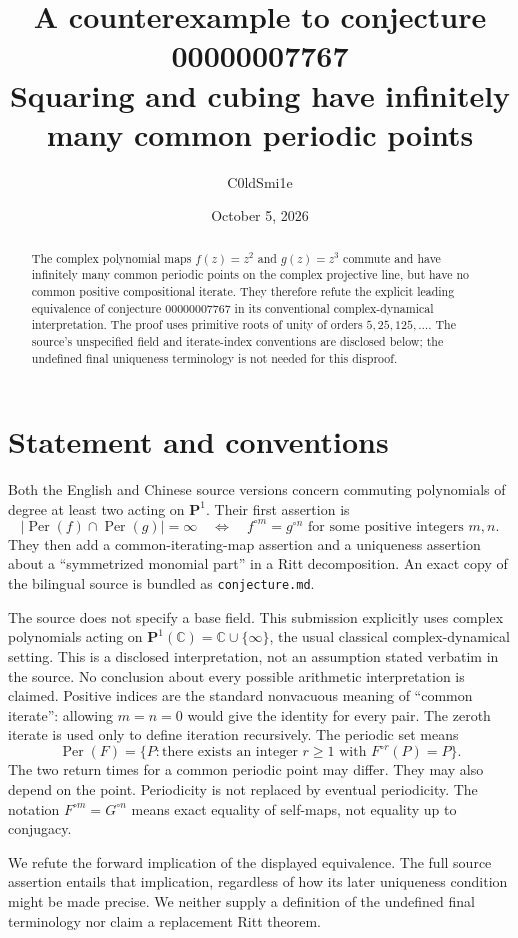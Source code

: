 \documentclass[11pt]{article}
\title{A counterexample to conjecture 00000007767\\[3pt]
\large Squaring and cubing have infinitely many common periodic points}
\author{C0ldSmi1e}
\date{October 5, 2026}
\newcommand{\C}{\mathbb C}
\newcommand{\PP}{\mathbf P^1(\C)}
\newcommand{\Per}{\operatorname{Per}}
\begin{document}
\maketitle
\begin{abstract}
The complex polynomial maps $f(z)=z^2$ and $g(z)=z^3$ commute and have
infinitely many common periodic points on the complex projective line, but
have no common positive compositional iterate. They therefore refute the
explicit leading equivalence of conjecture 00000007767 in its conventional
complex-dynamical interpretation. The proof uses primitive roots of unity
of orders $5,25,125,\ldots$. The source's unspecified field and iterate-index
conventions are disclosed below; the undefined final uniqueness terminology
is not needed for this disproof.
\end{abstract}

\section{Statement and conventions}
Both the English and Chinese source versions concern commuting polynomials
of degree at least two acting on $\mathbf P^1$. Their first assertion is
\[
 |\Per(f)\cap\Per(g)|=\infty
 \quad\Longleftrightarrow\quad
 \text{$f^{\circ m}=g^{\circ n}$ for some positive integers $m,n$}.
\]
They then add a common-iterating-map assertion and a uniqueness assertion
about a ``symmetrized monomial part'' in a Ritt decomposition. An exact copy
of the bilingual source is bundled as \texttt{conjecture.md}.

The source does not specify a base field. This submission explicitly uses
complex polynomials acting on $\PP=\C\cup\{\infty\}$, the usual classical
complex-dynamical setting. This is a disclosed interpretation, not an
assumption stated verbatim in the source. No conclusion about every possible
arithmetic interpretation is claimed. Positive indices are the standard
nonvacuous meaning of ``common iterate'': allowing $m=n=0$ would give the
identity for every pair. The zeroth iterate is used only to define iteration
recursively. The periodic set means
\[
 \Per(F)=\{P:\text{there exists an integer }r\geq1
                  \text{ with }F^{\circ r}(P)=P\}.
\]
The two return times for a common periodic point may differ. They may also
depend on the point. Periodicity is not replaced by eventual periodicity.
The notation $F^{\circ m}=G^{\circ n}$ means exact equality of self-maps,
not equality up to conjugacy.

We refute the forward implication of the displayed equivalence. The full
source assertion entails that implication, regardless of how its later
uniqueness condition might be made precise. We neither supply a definition
of the undefined final terminology nor claim a replacement Ritt theorem.
\end{document}
